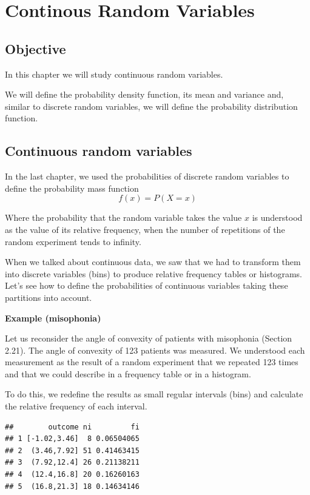 \documentclass[
]{book}
\begin{document}
\hypertarget{continous-random-variables}{%
\chapter{Continous Random Variables}\label{continous-random-variables}}

\hypertarget{objective-1}{%
\section{Objective}\label{objective-1}}

In this chapter we will study continuous random variables.

We will define the probability density function, its mean and variance and, similar to discrete random variables, we will define the probability distribution function.

\hypertarget{continuous-random-variables}{%
\section{Continuous random variables}\label{continuous-random-variables}}

In the last chapter, we used the probabilities of discrete random variables to define the probability mass function \[f(x)=P(X= x)\]

Where the probability that the random variable takes the value \(x\) is understood as the value of its relative frequency, when the number of repetitions of the random experiment tends to infinity.

When we talked about continuous data, we saw that we had to transform them into discrete variables (bins) to produce relative frequency tables or histograms. Let's see how to define the probabilities of continuous variables taking these partitions into account.

\textbf{Example (misophonia)}

Let us reconsider the angle of convexity of patients with misophonia (Section 2.21). The angle of convexity of 123 patients was measured. We understood each measurement as the result of a random experiment that we repeated 123 times and that we could describe in a frequency table or in a histogram.

To do this, we redefine the results as small regular intervals (bins) and calculate the relative frequency of each interval.

\begin{verbatim}
##        outcome ni         fi
## 1 [-1.02,3.46]  8 0.06504065
## 2  (3.46,7.92] 51 0.41463415
## 3  (7.92,12.4] 26 0.21138211
## 4  (12.4,16.8] 20 0.16260163
## 5  (16.8,21.3] 18 0.14634146
\end{verbatim}
\end{document}
